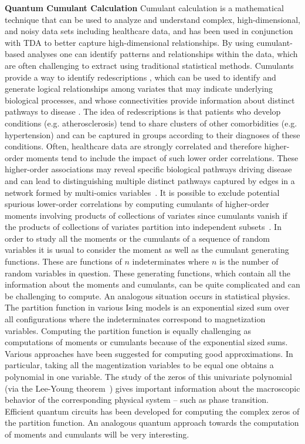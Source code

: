 \documentclass{article}
\begin{document}
\vspace{.25cm}
\noindent\textbf{Quantum Cumulant Calculation} Cumulant calculation is a mathematical technique that can be used to analyze and understand complex, high-dimensional, and noisy data sets including healthcare data, and has been used in conjunction with TDA to better capture high-dimensional relationships. By using cumulant-based analyses one can identify patterns and relationships within the data, which are often challenging to extract using traditional statistical methods. 
Cumulants provide a way to identify redescriptions \cite{parida_l_redescription_2005}, which can be used to identify and generate logical relationships among variates that may indicate underlying biological processes, and whose connectivities provide information about distinct pathways to disease \cite{platt_character2016,karisani_topology_2022}.  The idea of redescriptions is that patients who develop conditions (e.g. atherosclerosis) tend to share clusters of other comorbidities (e.g. hypertension) and can be captured in groups according to their diagnoses of these conditions.  
Often, healthcare data are strongly correlated and therefore higher-order moments tend to include the impact of such lower order correlations. These higher-order associations may reveal specific biological pathways driving disease and can lead to distinguishing multiple distinct pathways captured by edges in a network formed by multi-omics variables~\cite{platt_epidemiological_2022, bose_cuna_2021}. It is possible to exclude potential spurious lower-order correlations by computing cumulants of higher-order moments involving products of collections of variates since cumulants vanish if the products of collections of variates partition into independent subsets~\cite{percus_correlation_1975}. In order to study all the moments or the cumulants of a sequence of random variables it is usual to consider the moment as well as the cumulant generating functions. These are functions of $n$ indeterminates where $n$ is the number of random variables in question. These generating functions, which contain all the information about the moments and cumulants, can be quite complicated and can be challenging to compute. An analogous situation occurs in statistical physics. The partition function in various Ising models is an exponential sized sum over all configurations where the indeterminates correspond to magnetization variables. Computing the partition function is equally challenging as computations of moments or cumulants because of the exponential sized sums. Various approaches have been suggested for computing good approximations. In particular, taking all the magentization variables to be equal one obtains a polynomial in one variable. The study of the zeros of this univariate polynomial (via the Lee-Young theorem~\cite{lee_statistical_1952}) gives important information about the macroscopic behavior of the corresponding physical system -- such as phase transition. Efficient quantum circuits has been developed for computing the complex zeros of the partition function. An analogous quantum approach towards the computation of moments and cumulants will be very interesting.
\end{document}
